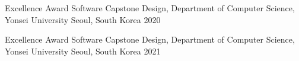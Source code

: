 


\begin{cvhonors}

  \cvhonor
    {Excellence Award} %
    {Software Capstone Design, Department of Computer Science, Yonsei University} %
    {Seoul, South Korea} %
    {2020} %

  \cvhonor
    {Excellence Award} %
    {Software Capstone Design, Department of Computer Science, Yonsei University} %
    {Seoul, South Korea} %
    {2021} %

\end{cvhonors}
